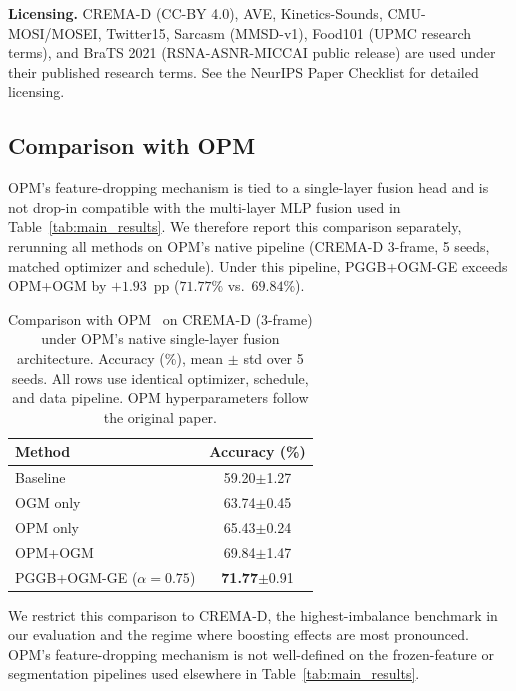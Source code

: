 \documentclass{article}
\begin{document}
\noindent\textbf{Licensing.} CREMA-D (CC-BY 4.0), AVE, Kinetics-Sounds, CMU-MOSI/MOSEI, Twitter15, Sarcasm (MMSD-v1), Food101 (UPMC research terms), and BraTS 2021 (RSNA-ASNR-MICCAI public release) are used under their published research terms. See the NeurIPS Paper Checklist for detailed licensing.

\subsection{Comparison with OPM}
\label{app:opm_comparison}

OPM's feature-dropping mechanism is tied to a single-layer fusion head and is not drop-in compatible with the multi-layer MLP fusion used in Table~\ref{tab:main_results}. We therefore report this comparison separately, rerunning all methods on OPM's native pipeline (CREMA-D 3-frame, 5 seeds, matched optimizer and schedule). Under this pipeline, PGGB+OGM-GE exceeds OPM+OGM by $+1.93$~pp ($71.77\%$ vs.\ $69.84\%$).

\begin{table}[H]
\centering
\caption{Comparison with OPM~\citep{wei2024opm} on CREMA-D (3-frame) under OPM's native single-layer fusion architecture. Accuracy (\%), mean $\pm$ std over 5 seeds. All rows use identical optimizer, schedule, and data pipeline. OPM hyperparameters follow the original paper.}
\label{tab:opm}
\vspace{0.5em}
\begin{tabular}{lc}
\toprule
\textbf{Method} & \textbf{Accuracy (\%)} \\
\midrule
Baseline               & 59.20{\scriptsize$\pm$1.27} \\
OGM only               & 63.74{\scriptsize$\pm$0.45} \\
OPM only               & 65.43{\scriptsize$\pm$0.24} \\
OPM+OGM                & 69.84{\scriptsize$\pm$1.47} \\
PGGB+OGM-GE ($\alpha{=}0.75$) & \textbf{71.77}{\scriptsize$\pm$0.91} \\
\bottomrule
\end{tabular}
\end{table}

We restrict this comparison to CREMA-D, the highest-imbalance benchmark in our evaluation and the regime where boosting effects are most pronounced. OPM's feature-dropping mechanism is not well-defined on the frozen-feature or segmentation pipelines used elsewhere in Table~\ref{tab:main_results}.
\end{document}
